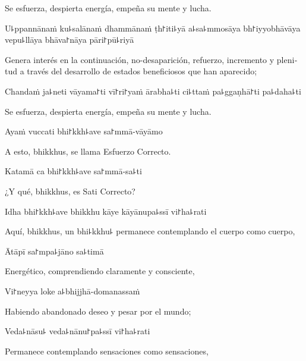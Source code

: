 \begin{english}
	Se esfuerza, despierta energía, empeña su mente y lucha.
\end{english}

\ifaivedition
\clearpage
\fi

U꜕ppannānaṁ ku꜕salānaṁ dhammānaṁ ṭh꜓iti꜕yā a꜕sa꜕mmosāya bh꜓iyyobhāvāya vepu꜕llāya bhāva꜓nāya pāri꜓pū꜕riyā

\begin{english}
	Genera interés en la continuación, no-desaparición, refuerzo, incremento y plenitud a través del desarrollo de estados beneficiosos que han aparecido;
\end{english}

Chandaṁ ja꜕neti vāyama꜓ti vī꜓ri꜓yaṁ ārabha꜕ti ci꜕ttaṁ pa꜕ggaṇhā꜓ti pa꜕daha꜕ti

\begin{english}
	Se esfuerza, despierta energía, empeña su mente y lucha.
\end{english}

Ayaṁ vuccati bhi꜓kkh꜕ave sa꜓mmā-vāyāmo

\begin{english}
	A esto, bhikkhus, se llama Esfuerzo Correcto.
\end{english}

Katamā ca bhi꜓kkh꜕ave sa꜓mmā-sa꜕ti

\begin{english}
	¿Y qué, bhikkhus, es Sati Correcto?
\end{english}

Idha bhi꜓kkh꜕ave bhikkhu kāye kāyānupa꜕ssī vi꜓ha꜕rati

\begin{english}
	Aquí, bhikkhus, un bhi꜕kkhu꜕ permanece contemplando el cuerpo como cuerpo,
\end{english}

Ātāpī sa꜓mpa꜕jāno sa꜕timā

\begin{english}
	Energético, comprendiendo claramente y consciente,
\end{english}

Vi꜓neyya loke a꜕bhijjhā-domanassaṁ

\begin{english}
	Habiendo abandonado deseo y pesar por el mundo;
\end{english}

Veda꜕nāsu꜕ veda꜕nānu꜓pa꜕ssī vi꜓ha꜕rati

\begin{english}
	Permanece contemplando sensaciones como sensaciones,
\end{english}

